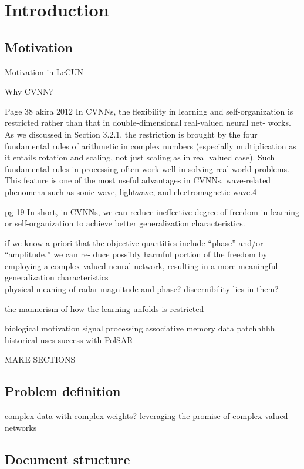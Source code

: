 \chapter{Introduction} \label{chap:intro}

\section{Motivation} \label{sect:thefirst}
Motivation in LeCUN

Why CVNN?

Page 38 akira 2012
 In CVNNs, the flexibility in learning and self-organization
is restricted rather than that in double-dimensional real-valued neural net-
works. As we discussed in Section 3.2.1, the restriction is brought by the four
fundamental rules of arithmetic in complex numbers (especially multiplication as it entails rotation and scaling, not just scaling as in real valued case). Such fundamental rules
in processing often work well in solving real world problems. This feature is
one of the most useful advantages in CVNNs. wave-related phenomena
such as sonic wave, lightwave, and electromagnetic wave.4

pg 19
In short, in CVNNs, we can reduce ineffective degree of freedom in
learning or self-organization to achieve better generalization characteristics.

 if we know a priori
that the objective quantities include “phase” and/or “amplitude,” we can re-
duce possibly harmful portion of the freedom by employing a complex-valued
neural network, resulting in a more meaningful generalization characteristics\\

physical meaning of radar magnitude and phase? discernibility lies in them?

the mannerism of how the learning unfolds is restricted


biological motivation
signal processing
associative memory
data patchhhhh
historical uses
success with PolSAR

MAKE SECTIONS
 



\section{Problem definition} \label{sect:thefirst}
complex data with complex weights?
leveraging the promise of complex valued networks

\section{Document structure} \label{sect:thefirst}

